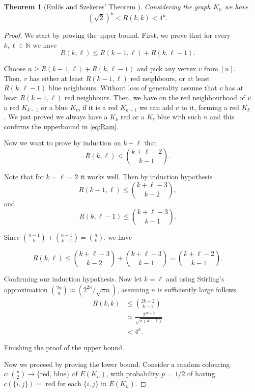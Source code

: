 \documentclass[12pt,twoside,a4paper,bibliography=totocnumbered]{book}
\numberwithin{equation}{section}
\newtheorem{theorem}             {Theorem}[section]
\theoremstyle{remark}
\begin{document}
\begin{theorem}[{Erd\H{o}s and Szekeres' Theorem \cite{ersz35, Er47}}]\label{thm:ErdosandS}
Considering the graph $K_n$ we have
$$(\sqrt{2})^k < R(k,k) < 4^k.$$
\end{theorem}
\begin{proof} We start by proving the upper bound. First, we prove that for every $k, \ell \in \mathbb{N}$ we have
\begin{equation}\label{eq:Ram}
R(k,\ell ) \leq R(k-1,\ell )+R(k,\ell-1).
\end{equation}

Choose $n \geq R(k-1,\ell) + R(k, \ell-1)$ and pick any vertex $v$ from $[n]$. Then, $v$ has either at least $R(k-1,\ell)$ red neighbours, or at least $R(k,\ell-1)$ blue neighbours. Without loss of generality assume that $v$ has at least $R(k-1,\ell)$ red neighbours. Then, we have on the red neighbourhood of $v$ a red $K_{k-1}$ or a blue $K_{\ell}$, if it is a red $K_{k-1}$ we can add $v$ to it, forming a red $K_k$. We just proved we always have a $K_k$ red or a $K_{\ell}$ blue with such $n$ and this confirms the upperbound in \eqref{eq:Ram}.

Now we want to prove by induction on $k+\ell$ that
$$R(k,\ell) \leq \binom{k+\ell - 2}{k - 1}.$$

Note that for $k = \ell = 2$ it works well. Then by induction hypothesis
$$R(k-1,\ell)\leq \binom{k+\ell -3}{k-2},$$ and $$R(k,\ell-1)\leq \binom{k+\ell-3}{k-1}.$$

Since $\binom{n-1}{k} + \binom{n-1}{k-1} = \binom{n}{k}$, we have

$$R(k,\ell)\leq \binom{k+\ell-3}{k-2} + \binom{k+\ell-3}{k-1} = \binom{k+ \ell -2}{k-1}.$$

Confirming our induction hypothesis. Now let $k = \ell$ and using Stirling's approximation  $\binom{2n}{n} \approx (2^{2n}/\sqrt{\pi n})$, assuming $n$ is sufficiently large follows
\begin{align*}
R(k,k) &\leq \binom{2k -2}{k-1}\\
& \approx \frac{2^{2k-2}}{\sqrt{\pi (k-1)}}\\
& < 4^k.
\end{align*}

Finishing the proof of the upper bound.

Now we proceed by proving the lower bound. Consider a random colouring $c\colon \binom{n}{2} \rightarrow \{$red, blue$\}$ of $E(K_n)$, with probability $p$ = $1/2$ of having $c(\{i,j\}) =$ red for each $\{i,j\}$ in $E(K_n)$.


\end{proof}
\end{document}
